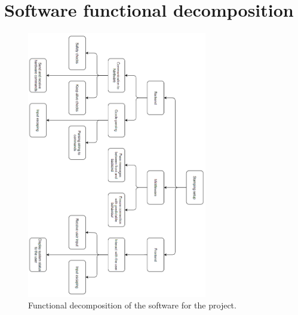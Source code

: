 \documentclass[10pt]{article}
\begin{document}
\section{Software functional decomposition}
\label{ap:software_functional_decomposition}
\begin{figure}[htp]
  \centering
  \includegraphics[width=0.7\textwidth]{img/design_cycle/functional_decomposition_software.png}
  \caption{Functional decomposition of the software for the project.}
  \label{fig:functional_decomposition_software}
\end{figure}

\clearpage
\end{document}
